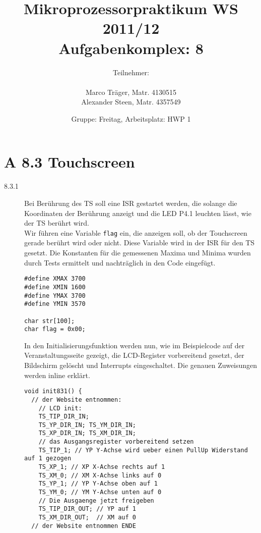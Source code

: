\documentclass[11pt,a4paper,ngerman]{article}
\author{Teilnehmer:\\ \\Marco Träger, Matr. 4130515\\Alexander Steen, Matr. 4357549}
\date{Gruppe: Freitag, Arbeitsplatz: HWP 1}
\title{Mikroprozessorpraktikum WS 2011/12\\ Aufgabenkomplex: 8}
\begin{document}

\maketitle
\thispagestyle{fancy}
\newpage
\section*{A 8.3 Touchscreen}

\begin{description}
\item[8.3.1] Bei Berührung des TS soll eine ISR gestartet werden, die solange die Koordinaten der Berührung anzeigt und die LED P4.1 leuchten lässt, wie der TS berührt wird. \\

Wir führen eine Variable \texttt{flag} ein, die anzeigen soll, ob der Touchscreen gerade berührt wird oder nicht. Diese Variable wird in der ISR für den TS gesetzt. Die Konstanten für die gemessenen Maxima und Minima wurden durch Tests ermittelt und nachträglich in den Code eingefügt.

\begin{lstlisting}
#define XMAX 3700
#define XMIN 1600
#define YMAX 3700
#define YMIN 3570

char str[100];
char flag = 0x00;
\end{lstlisting}

In den Initialisierungsfunktion werden nun, wie im Beispielcode auf der Veranstaltungsseite gezeigt, die LCD-Register vorbereitend gesetzt, der Bildschirm gelöscht und Interrupts eingeschaltet. Die genauen Zuweisungen werden inline erklärt.

\begin{lstlisting}
void init831() {
  // der Website entnommen:
	// LCD init:
	TS_TIP_DIR_IN;
	TS_YP_DIR_IN; TS_YM_DIR_IN;
	TS_XP_DIR_IN; TS_XM_DIR_IN;
	// das Ausgangsregister vorbereitend setzen
	TS_TIP_1; // YP Y-Achse wird ueber einen PullUp Widerstand auf 1 gezogen
	TS_XP_1; // XP X-Achse rechts auf 1
	TS_XM_0; // XM X-Achse links auf 0
	TS_YP_1; // YP Y-Achse oben auf 1
	TS_YM_0; // YM Y-Achse unten auf 0
	// Die Ausgaenge jetzt freigeben
	TS_TIP_DIR_OUT; // YP auf 1
	TS_XM_DIR_OUT;  // XM auf 0 
  // der Website entnommen ENDE


\end{lstlisting}
\end{description}
\end{document}
